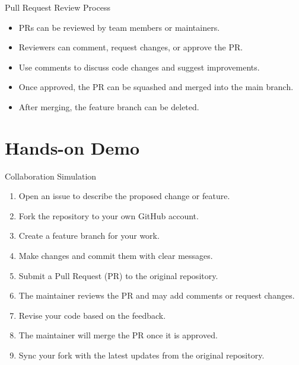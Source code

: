 \documentclass[12pt]{beamer}
\begin{document}
\begin{frame}{Pull Request Review Process}
  \begin{itemize}
    \setlength\itemsep{1em}
    \item PRs can be reviewed by team members or maintainers.
    \item Reviewers can comment, request changes, or approve the PR.
    \item Use comments to discuss code changes and suggest improvements.
    \item Once approved, the PR can be squashed and merged into the main branch.
    \item After merging, the feature branch can be deleted.
  \end{itemize}

\end{frame}

\section{Hands-on Demo}


\begin{frame}{Collaboration Simulation}
  
  \begin{enumerate}
    \setlength\itemsep{0.5em}
    \item Open an issue to describe the proposed change or feature.
    \item Fork the repository to your own GitHub account.
    \item Create a feature branch for your work.
    \item Make changes and commit them with clear messages.
    \item Submit a Pull Request (PR) to the original repository.
    \item The maintainer reviews the PR and may add comments or request changes.    \item Revise your code based on the feedback.
    \item The maintainer will merge the PR once it is approved.
    \item Sync your fork with the latest updates from the original repository.
  \end{enumerate}
\end{frame}
\end{document}
